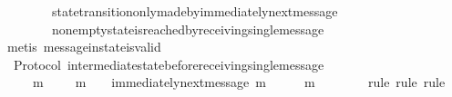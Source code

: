 \begin{isabellebody}
\ \ \ \ \ \ \ \ state{\isacharunderscore}transition{\isacharunderscore}only{\isacharunderscore}made{\isacharunderscore}by{\isacharunderscore}immediately{\isacharunderscore}next{\isacharunderscore}message\ \isanewline
\ \ \ \ \ \ \ \ non{\isacharunderscore}empty{\isacharunderscore}state{\isacharunderscore}is{\isacharunderscore}reached{\isacharunderscore}by{\isacharunderscore}receiving{\isacharunderscore}single{\isacharunderscore}message\isanewline
\ \ \isamarkupfalse%
\ {\isacharparenleft}metis\ message{\isacharunderscore}in{\isacharunderscore}state{\isacharunderscore}is{\isacharunderscore}valid{\isacharparenright}%
\endisatagproof
{\isafoldproof}%
%
\isadelimproof
\isanewline
%
\endisadelimproof
\isanewline
{}\isamarkupfalse%
\ {\isacharparenleft}\ Protocol{\isacharparenright}\ intermediate{\isacharunderscore}state{\isacharunderscore}before{\isacharunderscore}receiving{\isacharunderscore}single{\isacharunderscore}message\ {\isacharcolon}\isanewline
\ \ {\isachardoublequoteopen}{\isasymforall}\ {\isasymsigma}\ {\isasymsigma}{\isacharprime}{\isachardot}\ {\isacharbraceleft}{\isasymsigma}{\isacharcomma}\ {\isasymsigma}{\isacharprime}{\isacharbraceright}\ {\isasymsubseteq}\ {\isasymSigma}\ {\isasymand}\ {\isasymsigma}\ {\isasymsubset}\ {\isasymsigma}{\isacharprime}\ {\isasymand}\ {\isasymsigma}{\isacharprime}\ {\isasymnoteq}\ {\isasymemptyset}\ \isanewline
\ \ {\isasymlongrightarrow}\ {\isacharparenleft}{\isasymexists}\ {\isasymsigma}{\isacharprime}{\isacharprime}\ m{\isachardot}\ {\isasymsigma}{\isacharprime}{\isacharprime}\ {\isasymin}\ {\isasymSigma}\ {\isasymand}\ m\ {\isasymin}\ {\isasymsigma}{\isacharprime}\ {\isasymand}\ immediately{\isacharunderscore}next{\isacharunderscore}message{\isacharparenleft}{\isasymsigma}{\isacharprime}{\isacharprime}{\isacharcomma}\ m{\isacharparenright}\ {\isasymand}\ {\isasymsigma}{\isacharprime}\ {\isacharequal}\ {\isasymsigma}{\isacharprime}{\isacharprime}\ {\isasymunion}\ {\isacharbraceleft}m{\isacharbraceright}\ {\isasymand}\ {\isasymsigma}\ {\isasymsubseteq}\ {\isasymsigma}{\isacharprime}{\isacharprime}{\isacharparenright}{\isachardoublequoteclose}\isanewline
%
\isadelimproof
\ \ %
\endisadelimproof
%
\isatagproof
{}\isamarkupfalse%
\ {\isacharparenleft}rule{\isacharcomma}\ rule{\isacharcomma}\ rule{\isacharparenright}\isanewline
{}\isamarkupfalse%
\ {\isacharminus}\isanewline
\ \ \isamarkupfalse%
\ {\isasymsigma}\ {\isasymsigma}{\isacharprime}\isanewline
\ \ \isamarkupfalse%
\ {\isachardoublequoteopen}{\isacharbraceleft}{\isasymsigma}{\isacharcomma}\ {\isasymsigma}{\isacharprime}{\isacharbraceright}\ {\isasymsubseteq}\ {\isasymSigma}\ {\isasymand}\ {\isasymsigma}\ {\isasymsubset}\ {\isasymsigma}{\isacharprime}\ {\isasymand}\ {\isasymsigma}{\isacharprime}\ {\isasymnoteq}\ {\isasymemptyset}{\isachardoublequoteclose}\isanewline

\end{isabellebody}
